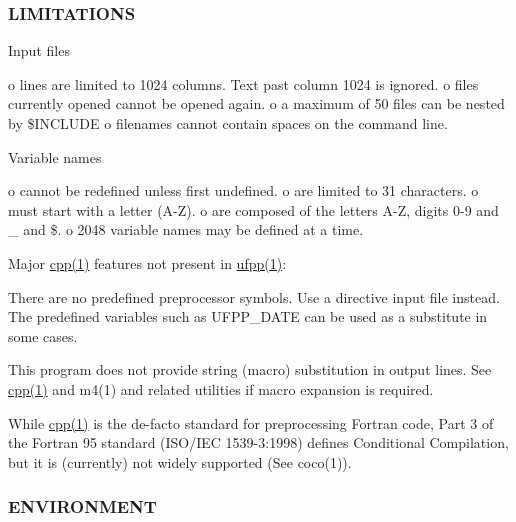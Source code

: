 \subsubsection*{L\+I\+M\+I\+T\+A\+T\+I\+O\+NS}



Input files

o lines are limited to 1024 columns. Text past column 1024 is ignored. o files currently opened cannot be opened again. o a maximum of 50 files can be nested by \$\+I\+N\+C\+L\+U\+DE o filenames cannot contain spaces on the command line.

Variable names

o cannot be redefined unless first undefined. o are limited to 31 characters. o must start with a letter (A-\/Z). o are composed of the letters A-\/Z, digits 0-\/9 and \+\_\+ and \$. o 2048 variable names may be defined at a time.

Major \hyperlink{ufpp__overview_81_8txt_ad80405d1dd53db5cd0aa7a8cc7e457a3}{cpp(1)} features not present in \hyperlink{ufpp__overview_81_8txt_a97c20a96bcab81bc74c9d64b001f1202}{ufpp(1)}\+:

There are no predefined preprocessor symbols. Use a directive input file instead. The predefined variables such as U\+F\+P\+P\+\_\+\+D\+A\+TE can be used as a substitute in some cases.

This program does not provide string (macro) substitution in output lines. See \hyperlink{ufpp__overview_81_8txt_ad80405d1dd53db5cd0aa7a8cc7e457a3}{cpp(1)} and m4(1) and related utilities if macro expansion is required.

While \hyperlink{ufpp__overview_81_8txt_ad80405d1dd53db5cd0aa7a8cc7e457a3}{cpp(1)} is the de-\/facto standard for preprocessing Fortran code, Part 3 of the Fortran 95 standard (I\+S\+O/\+I\+EC 1539-\/3\+:1998) defines Conditional Compilation, but it is (currently) not widely supported (See coco(1)).

\subsubsection*{E\+N\+V\+I\+R\+O\+N\+M\+E\+NT}

